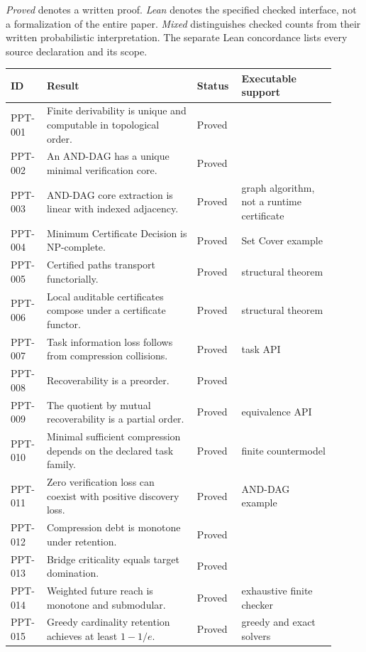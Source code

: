 \documentclass[11pt,oneside]{article}
\theoremstyle{definition}
\theoremstyle{remark}
\begin{document}
\emph{Proved} denotes a written proof. \emph{Lean} denotes the specified checked interface, not a formalization of the entire paper. \emph{Mixed} distinguishes checked counts from their written probabilistic interpretation. The separate Lean concordance lists every source declaration and its scope.

\begin{longtable}{@{}L{0.09\linewidth}L{0.43\linewidth}L{0.12\linewidth}L{0.27\linewidth}@{}}
\toprule
ID & Result & Status & Executable support\\
\midrule
\endhead
PPT-001 & Finite derivability is unique and computable in topological order. & Proved & \\
PPT-002 & An AND-DAG has a unique minimal verification core. & Proved & \\
PPT-003 & AND-DAG core extraction is linear with indexed adjacency. & Proved & graph algorithm, not a runtime certificate\\
PPT-004 & Minimum Certificate Decision is NP-complete. & Proved & Set Cover example\\
PPT-005 & Certified paths transport functorially. & Proved & structural theorem\\
PPT-006 & Local auditable certificates compose under a certificate functor. & Proved & structural theorem\\
PPT-007 & Task information loss follows from compression collisions. & Proved & task API\\
PPT-008 & Recoverability is a preorder. & Proved & \\
PPT-009 & The quotient by mutual recoverability is a partial order. & Proved & equivalence API\\
PPT-010 & Minimal sufficient compression depends on the declared task family. & Proved & finite countermodel\\
PPT-011 & Zero verification loss can coexist with positive discovery loss. & Proved & AND-DAG example\\
PPT-012 & Compression debt is monotone under retention. & Proved & \\
PPT-013 & Bridge criticality equals target domination. & Proved & \\
PPT-014 & Weighted future reach is monotone and submodular. & Proved & exhaustive finite checker\\
PPT-015 & Greedy cardinality retention achieves at least $1-1/e$. & Proved & greedy and exact solvers\\

\end{longtable}
\end{document}
